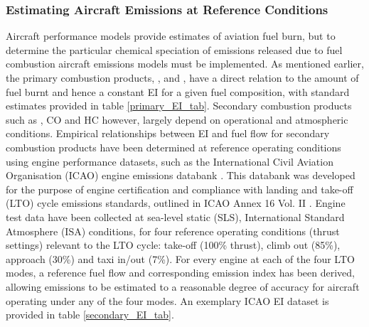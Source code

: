 \subsubsection{Estimating Aircraft Emissions at Reference Conditions}
Aircraft performance models provide estimates of aviation fuel burn, but to determine the particular chemical speciation of emissions released due to fuel combustion aircraft emissions models must be implemented. As mentioned earlier, the primary combustion products, ,  and , have a direct relation to the amount of fuel burnt and hence a constant EI for a given fuel composition, with standard estimates provided in table \ref{primary_EI_tab}. Secondary combustion products such as , CO and HC however, largely depend on operational and atmospheric conditions. Empirical relationships between EI and fuel flow for secondary combustion products have been determined at reference operating conditions using engine performance datasets, such as the International Civil Aviation Organisation (ICAO) engine emissions databank \cite{ICAOEEDB}.  This databank was developed for the purpose of engine certification and compliance with landing and take-off (LTO) cycle emissions standards, outlined in ICAO Annex 16 Vol. II \cite{ICAO2008}. Engine test data have been collected at sea-level static (SLS), International Standard Atmosphere (ISA) conditions, for four reference operating conditions (thrust settings) relevant to the LTO cycle: take-off (100\% thrust), climb out (85\%), approach (30\%) and taxi in/out (7\%). For every engine at each of the four LTO modes, a reference fuel flow and corresponding emission index has been derived, allowing emissions to be estimated to a reasonable degree of accuracy for aircraft operating under any of the four modes. An exemplary ICAO EI dataset is provided in table \ref{secondary_EI_tab}.




